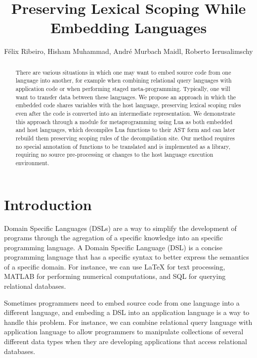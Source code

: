 \documentclass[english]{llncs}
\title{Preserving Lexical Scoping While Embedding Languages}
\author{
Félix Ribeiro,
Hisham Muhammad,
André Murbach Maidl,
Roberto Ierusalimschy
}
\institute{
Department of Computer Science --
PUC-Rio -- Rio de Janeiro -- Brazil
\email{\{fribeiro,hisham,amaidl,roberto\}@inf.puc-rio.br}
}
\begin{document}
\maketitle

\begin{abstract}

There are various situations in which one may want to embed source code from
one language into another, for example when combining relational query
languages with application code or when performing staged meta-programming.
Typically, one will want to transfer data between these languages.
We propose an approach in which the embedded code shares variables with the
host language, preserving lexical scoping rules even after the code is
converted into an intermediate representation. We demonstrate this approach
through a module for metaprogramming using Lua as both embedded and host
languages, which decompiles Lua functions to their AST form and can later
rebuild them preserving scoping rules of the decompilation site. Our method
requires no special annotation of functions to be translated and is
implemented as a library, requiring no source pre-processing or changes to
the host language execution environment.

\end{abstract}

\section{Introduction}
\label{sec:introduction}

Domain Specific Languages (DSLs) are a way to simplify the development
of programs through the agregation of a specific knowledge into an
specific programming language.
A Domain Specific Language (DSL) is a concise programming language that
has a specific syntax to better express the semantics of a specific domain. 
For instance, we can use LaTeX for text processing, MATLAB for performing
numerical computations, and SQL for querying relational databases.

Sometimes programmers need to embed source code from one language into
a different language, and embeding a DSL into an application language
is a way to handle this problem.
For instance, we can combine relational query language with application
language to allow programmers to manipulate collections of several
different data types when they are developing applications that
access relational databases.
\end{document}
